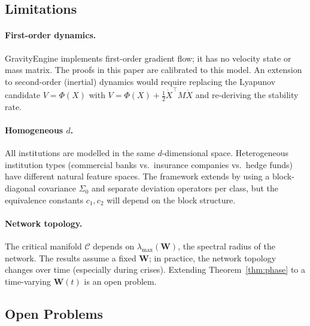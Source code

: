 \documentclass[11pt]{article}
\theoremstyle{definition}
\newcommand{\Cman}{\mathcal{C}}
\newcommand{\lmax}{\lambda_{\max}}
\begin{document}
\subsection{Limitations}

\paragraph{First-order dynamics.}
GravityEngine implements first-order gradient flow; it has no velocity state
or mass matrix.  The proofs in this paper are calibrated to this model.
An extension to second-order (inertial) dynamics would require replacing the
Lyapunov candidate $V = \Phi(X)$ with $V = \Phi(X) + \frac{1}{2}\dot X^\top M \dot X$
and re-deriving the stability rate.

\paragraph{Homogeneous $d$.}
All institutions are modelled in the same $d$-dimensional space.  Heterogeneous
institution types (commercial banks vs.\ insurance companies vs.\ hedge funds) have
different natural feature spaces.  The framework extends by using a block-diagonal
covariance $\Sigma_0$ and separate deviation operators per class, but the
equivalence constants $c_1, c_2$ will depend on the block structure.

\paragraph{Network topology.}
The critical manifold $\Cman$ depends on $\lmax(\mathbf{W})$, the spectral radius
of the network.  The results assume a fixed $\mathbf{W}$; in practice, the
network topology changes over time (especially during crises).  Extending
Theorem~\ref{thm:phase} to a time-varying $\mathbf{W}(t)$ is an open problem.

\subsection{Open Problems}
\end{document}
